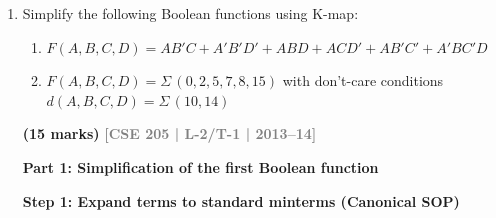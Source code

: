 \documentclass[12pt,a3paper]{article}
\newcommand{\yr}[1]{\hfill\textcolor{gray}{\small\textbf{[#1]}}}
\newcommand{\mk}[1]{\textcolor{orange!70!black}{\small\textbf{(#1 marks)}}}
\begin{document}
\begin{enumerate}
\begin{tcolorbox}[enhanced,breakable,ansbox,colback=cC!4,colframe=cC,boxrule=0.8pt,arc=5pt,title={\textbf{Answer}},fonttitle=\bfseries\color{white},colbacktitle=cC]
\textit{Note: There are alternative minimal choices for covering isolated minterms like $m_5$ and $m_{13}$ (e.g., pairing $m_5$ with $m_{13}$), but the selected combination maintains mathematical minimalism with $6$ product terms.}

\vspace{1em}
\textbf{4. Final Simplified SOP Expression}

Combining all the identified prime implicants, we yield the fully minimized Sum of Products (SOP) expression for the Boolean function:

\begin{center}
\end{center}

\end{tcolorbox}

\item Simplify the following Boolean functions using K-map:
\begin{enumerate}
  \item $F(A,B,C,D) = AB'C + A'B'D' + ABD + ACD' + AB'C' + A'BC'D$
  \item $F(A,B,C,D) = \Sigma\,(0,2,5,7,8,15)$ with don't-care conditions $d(A,B,C,D) = \Sigma\,(10,14)$
\end{enumerate}
\mk{15} \yr{CSE 205 | L-2/T-1 | 2013--14}

\begin{tcolorbox}[enhanced,breakable,ansbox,colback=cC!4,colframe=cC,boxrule=0.8pt,arc=5pt,title={\textbf{Answer}},fonttitle=\bfseries\color{white},colbacktitle=cC]

\textbf{\large Part 1: Simplification of the first Boolean function}

\vspace{0.5em}
\textbf{Step 1: Expand terms to standard minterms (Canonical SOP)}


\end{tcolorbox}
\end{enumerate}
\end{document}

